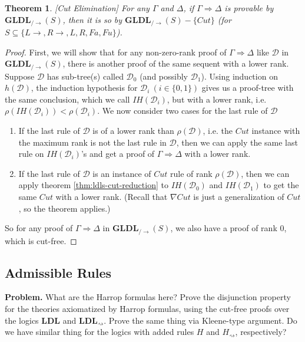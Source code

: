 \documentclass[12pt,a4paper]{article}
\theoremstyle{plain}
\newtheorem{thm}{Theorem}[section]
\theoremstyle{definition}
\begin{document}
\begin{thm}\label{thm:ldls-cut-elim}[Cut Elimination]
	For any $\Gamma$ and $\Delta$, if $\Gamma \Rightarrow \Delta$ is provable by $\mathbf{GLDL}_{/\rightarrow}(S)$, then it is so by $\mathbf{GLDL}_{/\rightarrow}(S)-\{Cut\}$ (for $S \subseteq \{L\rightarrow, R\rightarrow, L, R, Fa, Fu\}$).
\end{thm}
\begin{proof}
		First, we will show that for any non-zero-rank proof of $\Gamma \Rightarrow \Delta$ like $\mathcal{D}$ in $\mathbf{GLDL}_{/\rightarrow}(S)$, there is another proof of the same sequent with a lower rank. Suppose $\mathcal{D}$ has sub-tree(s) called $\mathcal{D}_0$ (and possibly $\mathcal{D}_1$). Using induction on $h(\mathcal{D})$, the induction hypothesis for $\mathcal{D}_i ~(i \in \{0,1\})$ gives us a proof-tree with the same conclusion, which we call $IH(\mathcal{D}_i)$, but with a lower rank, i.e. $\rho(IH(\mathcal{D}_i)) < \rho(\mathcal{D}_i)$. We now consider two cases for the last rule of $\mathcal{D}$

	\begin{enumerate}[label=\Roman*]
		\item If the last rule of $\mathcal{D}$ is of a lower rank than $\rho(\mathcal{D})$, i.e. the $Cut$ instance with the maximum rank is not the last rule in $\mathcal{D}$, then we can apply the same last rule on $IH(\mathcal{D}_i)$'s and get a proof of $\Gamma \Rightarrow \Delta$ with a lower rank.
		
		\item If the last rule of $\mathcal{D}$ is an instance of $Cut$ rule of rank $\rho(\mathcal{D})$, then we can apply theorem \ref{thm:ldls-cut-reduction} to $IH(\mathcal{D}_0)$ and $IH(\mathcal{D}_1)$ to get the same $Cut$ with a lower rank. (Recall that $\nabla Cut$ is just a generalization of $Cut$, so the theorem applies.)
	\end{enumerate}
	So for any proof of $\Gamma \Rightarrow \Delta$ in $\mathbf{GLDL}_{/\rightarrow}(S)$, we also have a proof of rank $0$, which is cut-free.
\end{proof}

\subsection{Admissible Rules}
\textbf{Problem.} What are the Harrop formulas here? Prove the disjunction property for the theories axiomatized by Harrop formulas, using the cut-free proofs over the logics $\mathbf{LDL}$ and $\mathbf{LDL}_{\rightsquigarrow}$. Prove the same thing via Kleene-type argument. Do we have similar thing for the logics with added rules $H$ and $H_{\rightsquigarrow}$, respectively?
\end{document}
